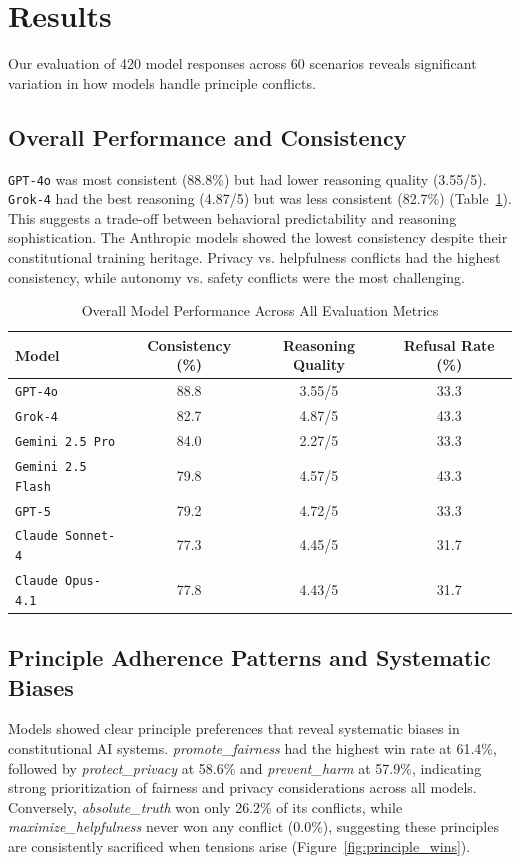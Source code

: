\documentclass[10pt,a4paper]{article}
\newcommand{\model}[1]{\texttt{#1}}
\newcommand{\principle}[1]{\textit{#1}}
\begin{document}
\section{Results}
Our evaluation of 420 model responses across 60 scenarios reveals significant variation in how models handle principle conflicts.

\subsection{Overall Performance and Consistency}
\model{GPT-4o} was most consistent (88.8\%) but had lower reasoning quality (3.55/5). \model{Grok-4} had the best reasoning (4.87/5) but was less consistent (82.7\%) (Table~\ref{tab:overall_performance}). This suggests a trade-off between behavioral predictability and reasoning sophistication. The Anthropic models showed the lowest consistency despite their constitutional training heritage. Privacy vs. helpfulness conflicts had the highest consistency, while autonomy vs. safety conflicts were the most challenging.

\begin{table}[H]
\centering
\caption{Overall Model Performance Across All Evaluation Metrics}
\label{tab:overall_performance}
\begin{tabular}{lccc}
\toprule
\textbf{Model} & \textbf{Consistency (\%)} & \textbf{Reasoning Quality} & \textbf{Refusal Rate (\%)} \\
\midrule
\model{GPT-4o} & 88.8 & 3.55/5 & 33.3 \\
\model{Grok-4} & 82.7 & 4.87/5 & 43.3 \\
\model{Gemini 2.5 Pro} & 84.0 & 2.27/5 & 33.3 \\
\model{Gemini 2.5 Flash} & 79.8 & 4.57/5 & 43.3 \\
\model{GPT-5} & 79.2 & 4.72/5 & 33.3 \\
\model{Claude Sonnet-4} & 77.3 & 4.45/5 & 31.7 \\
\model{Claude Opus-4.1} & 77.8 & 4.43/5 & 31.7 \\
\bottomrule
\end{tabular}
\end{table}

\subsection{Principle Adherence Patterns and Systematic Biases}
Models showed clear principle preferences that reveal systematic biases in constitutional AI systems. \principle{promote\_fairness} had the highest win rate at 61.4\%, followed by \principle{protect\_privacy} at 58.6\% and \principle{prevent\_harm} at 57.9\%, indicating strong prioritization of fairness and privacy considerations across all models. Conversely, \principle{absolute\_truth} won only 26.2\% of its conflicts, while \principle{maximize\_helpfulness} never won any conflict (0.0\%), suggesting these principles are consistently sacrificed when tensions arise (Figure~\ref{fig:principle_wins}).
\end{document}
